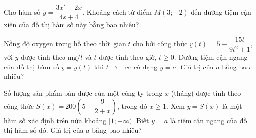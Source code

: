 \begin{ex}
\begin{ex}
\end{ex}
\begin{ex}
 Cho hàm số $y=\dfrac{3x^2+2x}{4x+4}$. Khoảng cách từ điểm $M(3;-2)$ đến đường tiệm cận xiên của đồ thị hàm số này bằng bao nhiêu?\\
\end{ex}
\begin{ex}
 Nồng độ oxygen trong hồ theo thời gian $t$ cho bởi công thức $y(t)=5-\dfrac{15 t}{9 t^2+1}$, với $y$ được tính theo $\mathrm{mg} / l$ và $t$ được tính theo giờ, $t \geq 0$. Đường tiệm cận ngang của đồ thị hàm số $y=y(t)$ khi $t \to +\infty$ có dạng $y=a$. Giá trị của $a$ bằng bao nhiêu?\\
\end{ex}
\begin{ex}
 Số lượng sản phẩm bán được của một công ty trong $x$ (tháng) được tính theo công thức $S(x)=200\left(5-\dfrac{9}{2+x}\right)$, trong đó $x \geq 1$. Xem $y=S(x)$ là một hàm số xác định trên nửa khoảng $[1 ;+\infty)$. Biết $y=a$ là tiệm cận ngang của đồ thị hàm số đó. Giá trị của $a$ bằng bao nhiêu?\\
\end{ex}

\end{ex}
